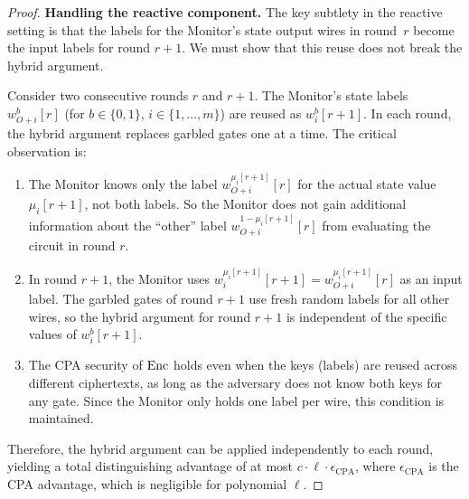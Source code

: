 \begin{proof}
\medskip
\noindent\textbf{Handling the reactive component.}
The key subtlety in the reactive setting is that the labels for the Monitor's state output wires in round~$r$ become the input labels for round $r+1$. We must show that this reuse does not break the hybrid argument.

Consider two consecutive rounds $r$ and $r+1$. The Monitor's state labels $w_{O+i}^b[r]$ (for $b \in \{0,1\}$, $i \in \{1, \ldots, m\}$) are reused as $w_i^b[r+1]$. In each round, the hybrid argument replaces garbled gates one at a time. The critical observation is:

\begin{enumerate}
    \item The Monitor knows only the label $w_{O+i}^{\mu_i[r+1]}[r]$ for the actual state value $\mu_i[r+1]$, not both labels. So the Monitor does not gain additional information about the ``other'' label $w_{O+i}^{1-\mu_i[r+1]}[r]$ from evaluating the circuit in round $r$.
    \item In round $r+1$, the Monitor uses $w_i^{\mu_i[r+1]}[r+1] = w_{O+i}^{\mu_i[r+1]}[r]$ as an input label. The garbled gates of round $r+1$ use fresh random labels for all other wires, so the hybrid argument for round $r+1$ is independent of the specific values of $w_i^b[r+1]$.
    \item The CPA security of $\text{Enc}$ holds even when the keys (labels) are reused across different ciphertexts, as long as the adversary does not know both keys for any gate. Since the Monitor only holds one label per wire, this condition is maintained.
\end{enumerate}

Therefore, the hybrid argument can be applied independently to each round, yielding a total distinguishing advantage of at most $c \cdot \ell \cdot \epsilon_{\text{CPA}}$, where $\epsilon_{\text{CPA}}$ is the CPA advantage, which is negligible for polynomial $\ell$.


\end{proof}
